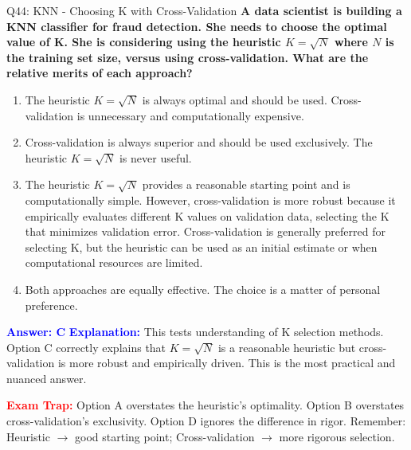 \documentclass[8pt]{beamer}
\begin{document}
	\begin{frame}{Q44: KNN - Choosing K with Cross-Validation}
		\fontsize{6.5}{7.5}\selectfont
		\textbf{A data scientist is building a KNN classifier for fraud detection. She needs to choose the optimal value of K. She is considering using the heuristic $K = \sqrt{N}$ where $N$ is the training set size, versus using cross-validation. What are the relative merits of each approach?}
		
		\begin{enumerate}
			\item The heuristic $K = \sqrt{N}$ is always optimal and should be used. Cross-validation is unnecessary and computationally expensive.
			\item Cross-validation is always superior and should be used exclusively. The heuristic $K = \sqrt{N}$ is never useful.
			\item The heuristic $K = \sqrt{N}$ provides a reasonable starting point and is computationally simple. However, cross-validation is more robust because it empirically evaluates different K values on validation data, selecting the K that minimizes validation error. Cross-validation is generally preferred for selecting K, but the heuristic can be used as an initial estimate or when computational resources are limited.
			\item Both approaches are equally effective. The choice is a matter of personal preference.
		\end{enumerate}
		
		\vspace{0.1cm}
		\textcolor{blue}{\textbf{Answer: C}}
		\vspace{0.1cm}
		\textcolor{blue}{\textbf{Explanation:}} This tests understanding of K selection methods. Option C correctly explains that $K = \sqrt{N}$ is a reasonable heuristic but cross-validation is more robust and empirically driven. This is the most practical and nuanced answer.
		
		\textcolor{red}{\textbf{Exam Trap:}} Option A overstates the heuristic's optimality. Option B overstates cross-validation's exclusivity. Option D ignores the difference in rigor. Remember: Heuristic $\rightarrow$ good starting point; Cross-validation $\rightarrow$ more rigorous selection.
	\end{frame}
	
\end{document}
